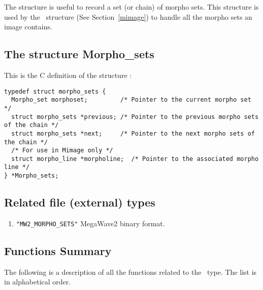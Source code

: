 The \msets{} structure is useful to record a set (or chain) of 
morpho sets. This structure is used by the \mimage\ structure (See Section~\ref{mimage}) to 
handle all the morpho sets an image contains.

\subsection{The structure Morpho\_sets}
\label{msets-structure}

This is the C definition of the structure \msets:
{\small
\begin{verbatim}
typedef struct morpho_sets {
  Morpho_set morphoset;         /* Pointer to the current morpho set */
  struct morpho_sets *previous; /* Pointer to the previous morpho sets of the chain */
  struct morpho_sets *next;     /* Pointer to the next morpho sets of the chain */
  /* For use in Mimage only */
  struct morpho_line *morpholine;  /* Pointer to the associated morpho line */
} *Morpho_sets;
\end{verbatim}
}

\subsection{Related file (external) types}
\label{msets-file_type}

\begin{enumerate}
\item \verb+"MW2_MORPHO_SETS"+ MegaWave2 binary format.
\end{enumerate}

\subsection{Functions Summary}
\label{msets-function}

The following is a description of all the functions related to 
the \msets\ type. The list is in alphabetical order.

\newpage %



